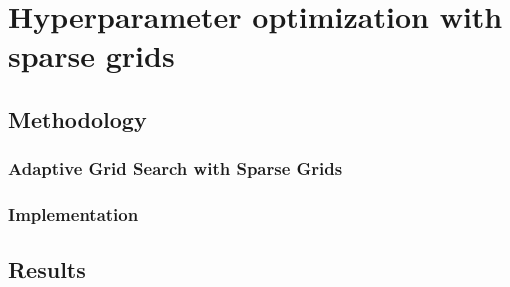 
\chapter{Hyperparameter optimization with sparse grids}\label{chapter:main_part}

\section{Methodology}

\subsection{Adaptive Grid Search with Sparse Grids}

\subsection{Implementation}

\section{Results}